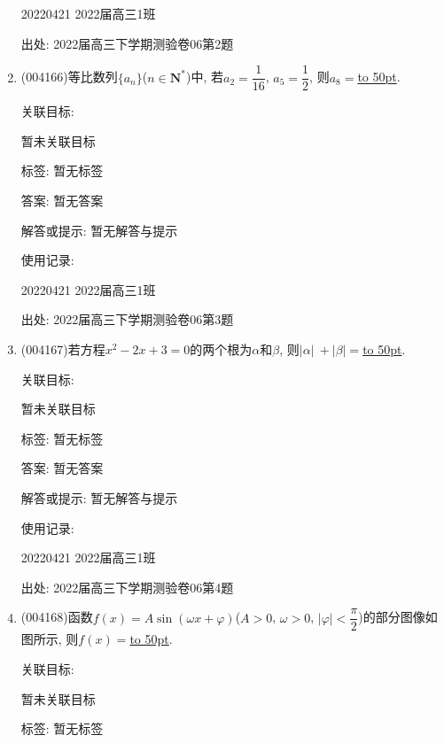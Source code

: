 \documentclass[10pt,a4paper]{article}
\newcommand{\blank}[1]{\underline{\hbox to #1pt{}}}
\begin{document}
\begin{enumerate}[1.]
20220421	2022届高三1班	


出处: 2022届高三下学期测验卷06第2题
\item { (004166)}等比数列$\{a_n\}$($n\in \mathbf{N}^*$)中, 若$a_2=\dfrac 1{16}$, $a_5=\dfrac 12$, 则$a_8=$\blank{50}.


关联目标:

暂未关联目标



标签: 暂无标签

答案: 暂无答案

解答或提示: 暂无解答与提示

使用记录:

20220421	2022届高三1班	


出处: 2022届高三下学期测验卷06第3题
\item { (004167)}若方程$x^2-2x+3=0$的两个根为$\alpha$和$\beta$, 则$|\alpha |\ +|\beta |=$\blank{50}.


关联目标:

暂未关联目标



标签: 暂无标签

答案: 暂无答案

解答或提示: 暂无解答与提示

使用记录:

20220421	2022届高三1班	


出处: 2022届高三下学期测验卷06第4题
\item { (004168)}函数$f(x)=A\sin (\omega x+\varphi)$($A>0$, $\omega>0$, $|\varphi|<\dfrac{\pi}2$)的部分图像如图所示, 则$f(x)=$\blank{50}.
\begin{center}
\end{center}


关联目标:

暂未关联目标



标签: 暂无标签


\end{enumerate}
\end{document}
